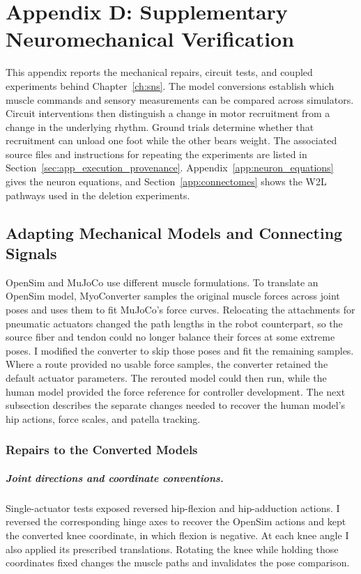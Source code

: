 \chapter{Appendix D: Supplementary Neuromechanical Verification}\label{app:simulation_verification}
\graphicspath{{../Figures/95-AppendixD/}{figs/95-AppendixD/}}

This appendix reports the mechanical repairs, circuit tests, and coupled experiments behind Chapter~\ref{ch:sns}. The model conversions establish which muscle commands and sensory measurements can be compared across simulators. Circuit interventions then distinguish a change in motor recruitment from a change in the underlying rhythm. Ground trials determine whether that recruitment can unload one foot while the other bears weight. The associated source files and instructions for repeating the experiments are listed in Section~\ref{sec:app_execution_provenance}. Appendix~\ref{app:neuron_equations} gives the neuron equations, and Section~\ref{app:connectomes} shows the W2L pathways used in the deletion experiments.

\section{Adapting Mechanical Models and Connecting Signals}\label{sec:app_conversion_repairs}

OpenSim and MuJoCo use different muscle formulations. To translate an OpenSim model, MyoConverter samples the original muscle forces across joint poses and uses them to fit MuJoCo's force curves. Relocating the attachments for pneumatic actuators changed the path lengths in the robot counterpart, so the source fiber and tendon could no longer balance their forces at some extreme poses. I modified the converter to skip those poses and fit the remaining samples. Where a route provided no usable force samples, the converter retained the default actuator parameters. The rerouted model could then run, while the human model provided the force reference for controller development. The next subsection describes the separate changes needed to recover the human model's hip actions, force scales, and patella tracking.

\subsection{Repairs to the Converted Models}

\paragraph{Joint directions and coordinate conventions.}
Single-actuator tests exposed reversed hip-flexion and hip-adduction actions. I reversed the corresponding hinge axes to recover the OpenSim actions and kept the converted knee coordinate, in which flexion is negative. At each knee angle I also applied its prescribed translations. Rotating the knee while holding those coordinates fixed changes the muscle paths and invalidates the pose comparison.

